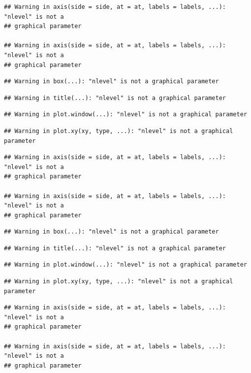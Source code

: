 \documentclass[
]{article}
\begin{document}
\begin{verbatim}
## Warning in axis(side = side, at = at, labels = labels, ...): "nlevel" is not a
## graphical parameter

## Warning in axis(side = side, at = at, labels = labels, ...): "nlevel" is not a
## graphical parameter
\end{verbatim}

\begin{verbatim}
## Warning in box(...): "nlevel" is not a graphical parameter
\end{verbatim}

\begin{verbatim}
## Warning in title(...): "nlevel" is not a graphical parameter
\end{verbatim}

\begin{verbatim}
## Warning in plot.window(...): "nlevel" is not a graphical parameter
\end{verbatim}

\begin{verbatim}
## Warning in plot.xy(xy, type, ...): "nlevel" is not a graphical parameter
\end{verbatim}

\begin{verbatim}
## Warning in axis(side = side, at = at, labels = labels, ...): "nlevel" is not a
## graphical parameter

## Warning in axis(side = side, at = at, labels = labels, ...): "nlevel" is not a
## graphical parameter
\end{verbatim}

\begin{verbatim}
## Warning in box(...): "nlevel" is not a graphical parameter
\end{verbatim}

\begin{verbatim}
## Warning in title(...): "nlevel" is not a graphical parameter
\end{verbatim}

\begin{verbatim}
## Warning in plot.window(...): "nlevel" is not a graphical parameter
\end{verbatim}

\begin{verbatim}
## Warning in plot.xy(xy, type, ...): "nlevel" is not a graphical parameter
\end{verbatim}

\begin{verbatim}
## Warning in axis(side = side, at = at, labels = labels, ...): "nlevel" is not a
## graphical parameter

## Warning in axis(side = side, at = at, labels = labels, ...): "nlevel" is not a
## graphical parameter
\end{verbatim}
\end{document}
